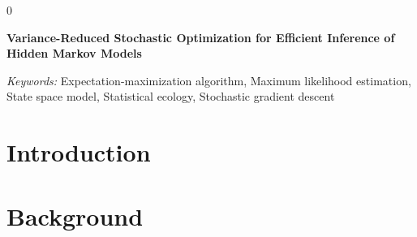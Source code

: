 \documentclass[11pt]{article}
\newcommand{\blind}{0}
\begin{document}
\blind
{
  \bigskip
  \bigskip
  \bigskip
  \begin{center}
    {\LARGE\bf Variance-Reduced Stochastic Optimization for Efficient Inference of Hidden Markov Models}
  \end{center}
  \medskip
} \fi

\bigskip
\begin{abstract}
    Hidden Markov models (HMMs) are popular models to identify a finite number of latent states from sequential data. However, fitting them to large data sets can be computationally demanding because most likelihood maximization techniques require iterating through the entire underlying data set for every parameter update. 
    We propose a novel optimization algorithm that updates the parameters of an HMM without iterating through the entire data set. Namely, we combine a partial E step with variance-reduced stochastic optimization within the M step. We prove the algorithm converges under certain regularity conditions. We test our algorithm empirically using a simulation study as well as a case study of kinematic data collected using suction-cup attached biologgers from eight northern resident killer whales ({\em{Orcinus orca}}) off the western coast of Canada. In both, our algorithm converges in fewer epochs and to regions of higher likelihood compared to standard numerical optimization techniques. Our algorithm allows practitioners to fit complicated HMMs to large time-series data sets more efficiently than existing baselines.
\end{abstract}

\noindent%
{\it Keywords:} Expectation-maximization algorithm, Maximum likelihood estimation, State space model, Statistical ecology, Stochastic gradient descent%
\vfill 

\newpage
{} %

\section{Introduction}


\section{Background}

\end{document}
